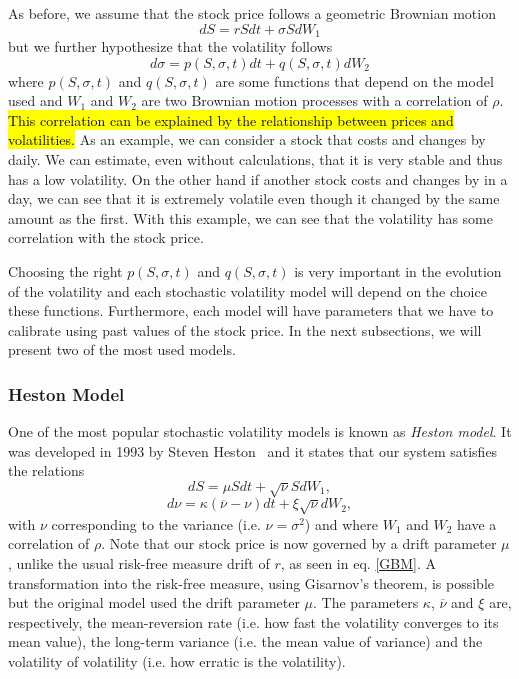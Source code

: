 As before, we assume that the stock price follows a geometric Brownian motion
\begin{equation}
dS=rSdt+\sigma SdW_1
\end{equation}
\noindent but we further hypothesize that the volatility follows
\begin{equation}
d\sigma=p(S,\sigma,t)dt+q(S,\sigma,t)dW_2
\end{equation}
\noindent where $p(S,\sigma,t)$ and $q(S,\sigma,t)$ are some functions that depend on the model used and $W_1$ and $W_2$ are two Brownian motion processes with a correlation of $\rho$. 
\hl{This correlation can be explained by the relationship between prices and volatilities.} As an example, we can consider a stock that costs  and changes by  daily. We can estimate, even without calculations, that it is very stable and thus has a low volatility.
On the other hand if another stock costs  and changes by  in a day, we can see that it is extremely volatile even though it changed by the same amount as the first. With this example, we can see that the volatility has some correlation with the stock price.

Choosing the right $p(S,\sigma,t)$ and $q(S,\sigma,t)$ is very important in the evolution of the volatility and each stochastic volatility model will depend on the choice these functions. Furthermore, each model will have parameters that we have to calibrate using past values of the stock price. In the next subsections, we will present two of the most used models.



\subsubsection{Heston Model}
One of the most popular stochastic volatility models is known as \emph{Heston model}. It was developed in 1993 by Steven Heston~\cite{Heston} and it states that our system satisfies the relations
\begin{equation}
dS=\mu Sdt+\sqrt{\nu}SdW_1,
\end{equation}
\begin{equation}
d\nu=\kappa(\overline{\nu}-\nu)dt+\xi\sqrt{\nu}dW_2,
\end{equation}
\noindent with $\nu$ corresponding to the variance (i.e. $\nu=\sigma^2$) and where $W_1$ and $W_2$ have a correlation of $\rho$. Note that our stock price is now governed by a drift parameter $\mu$, unlike the usual risk-free measure drift of $r$, as seen in eq. \eqref{GBM}. A transformation into the risk-free measure, using Gisarnov's theorem, is possible but the original model used the drift parameter $\mu$.
The parameters $\kappa$, $\overline{\nu}$ and $\xi$ are, respectively, the mean-reversion rate (i.e. how fast the volatility converges to its mean value), the long-term variance (i.e. the mean value of variance) and the volatility of volatility (i.e. how erratic is the volatility).

